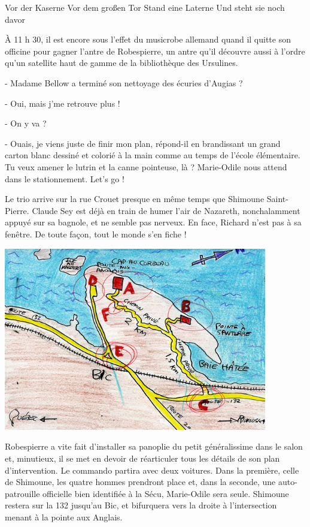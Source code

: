     Vor der Kaserne
    Vor dem großen Tor
    Stand eine Laterne
    Und steht sie noch davor 

À 11 h 30, il est encore sous l’effet du musicrobe allemand quand il quitte son officine pour gagner l’antre de Robespierre, un antre qu’il découvre aussi à l’ordre qu’un satellite haut de gamme de la bibliothèque des Ursulines.

- Madame Bellow a terminé son nettoyage des écuries d’Augias ?

- Oui, mais j’me retrouve plus !

- On y va ?

- Ouais, je viens juste de finir mon plan, répond-il en brandissant un grand carton blanc dessiné et colorié à la main comme au temps de l’école élémentaire. Tu veux amener le lutrin et la canne pointeuse, là ? Marie-Odile nous attend dans le stationnement. Let’s go !

Le trio arrive sur la rue Crouet presque en même temps que Shimoune Saint-Pierre. Claude Sey est déjà en train de humer l’air de Nazareth, nonchalamment appuyé sur sa bagnole, et ne semble pas nerveux. En face, Richard n’est pas à sa fenêtre. De toute façon, tout le monde s’en fiche !

\includegraphics[height=80mm]{corps/chapitre18/img/carte.jpg}

Robespierre a vite fait d’installer sa panoplie du petit généralissime dans le salon et, minutieux, il se met en devoir de réarticuler tous les détails de son plan d’intervention. Le commando partira avec deux voitures. Dans la première, celle de Shimoune, les quatre hommes prendront place et, dans la seconde, une auto-patrouille officielle bien identifiée à la Sécu, Marie-Odile sera seule. Shimoune restera sur la 132 jusqu’au Bic, et bifurquera vers la droite à l’intersection menant à la pointe aux Anglais.

